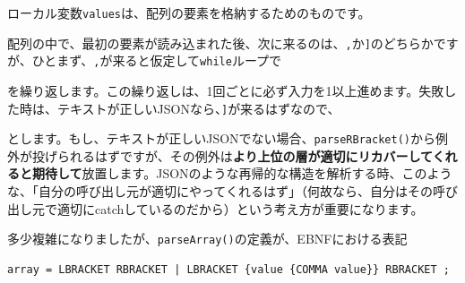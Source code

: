 \begin{Shaded}
\begin{Highlighting}[]
        \NormalTok{();}
         \NormalTok{\textless{}\textgreater{}();}
\NormalTok{();}
\end{Highlighting}
\end{Shaded}

ローカル変数\texttt{values}は、配列の要素を格納するためのものです。

配列の中で、最初の要素が読み込まれた後、次に来るのは、\texttt{,}か\texttt{{]}}のどちらかですが、ひとまず、\texttt{,}が来ると仮定して\texttt{while}ループで

\begin{Shaded}
\begin{Highlighting}[]
\NormalTok{();}
\NormalTok{();}
\end{Highlighting}
\end{Shaded}

を繰り返します。この繰り返しは、1回ごとに必ず入力を1以上進めます。失敗した時は、テキストが正しいJSONなら、\texttt{{]}}が来るはずなので、

\begin{Shaded}
\begin{Highlighting}[]
\NormalTok{();}
 
\end{Highlighting}
\end{Shaded}

とします。もし、テキストが正しいJSONでない場合、\texttt{parseRBracket()}から例外が投げられるはずですが、その例外は\textbf{より上位の層が適切にリカバーしてくれると期待して}放置します。JSONのような再帰的な構造を解析する時、このような、「自分の呼び出し元が適切にやってくれるはず」（何故なら、自分はその呼び出し元で適切にcatchしているのだから）という考え方が重要になります。

多少複雑になりましたが、\texttt{parseArray()}の定義が、EBNFにおける表記

\begin{verbatim}
array = LBRACKET RBRACKET | LBRACKET {value {COMMA value}} RBRACKET ;
\end{verbatim}

